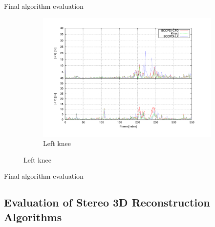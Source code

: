 \begin{frame}[plain]{Final algorithm evaluation}
\begin{figure}
        \begin{subfigure}[b]{0.4\columnwidth}
                \centering
                \includegraphics[width=\textwidth, trim=50 40 80 40,clip]{fig29.pdf}
                \caption*{Left knee}
        \end{subfigure}%
  \end{figure}
\end{frame}

\begin{frame}[plain]{Final algorithm evaluation}
 \begin{figure}
 \end{figure}
\end{frame}

\subsection{Evaluation of Stereo 3D Reconstruction Algorithms}

